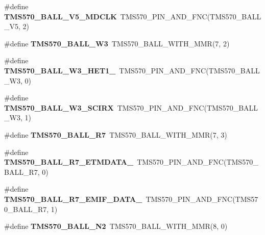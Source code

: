 \begin{DoxyCompactItemize}
\#define {\bfseries T\+M\+S570\+\_\+\+B\+A\+L\+L\+\_\+\+V5\+\_\+\+M\+D\+C\+LK}~T\+M\+S570\+\_\+\+P\+I\+N\+\_\+\+A\+N\+D\+\_\+\+F\+NC(T\+M\+S570\+\_\+\+B\+A\+L\+L\+\_\+\+V5, 2)
\item 
\mbox{\label{tms570ls3137zwt-pins_8h_af2acfd91bc4b3c388499a22ca91abc18}} 
\#define {\bfseries T\+M\+S570\+\_\+\+B\+A\+L\+L\+\_\+\+W3}~T\+M\+S570\+\_\+\+B\+A\+L\+L\+\_\+\+W\+I\+T\+H\+\_\+\+M\+MR(7, 2)
\item 
\mbox{\label{tms570ls3137zwt-pins_8h_a9218b1be6ec7d6c8f5b9c576c5be1f23}} 
\#define {\bfseries T\+M\+S570\+\_\+\+B\+A\+L\+L\+\_\+\+W3\+\_\+\+H\+E\+T1\+\_}~T\+M\+S570\+\_\+\+P\+I\+N\+\_\+\+A\+N\+D\+\_\+\+F\+NC(T\+M\+S570\+\_\+\+B\+A\+L\+L\+\_\+\+W3, 0)
\item 
\mbox{\label{tms570ls3137zwt-pins_8h_a04063c69d1ffd364aa96d262b5d6d18b}} 
\#define {\bfseries T\+M\+S570\+\_\+\+B\+A\+L\+L\+\_\+\+W3\+\_\+\+S\+C\+I\+RX}~T\+M\+S570\+\_\+\+P\+I\+N\+\_\+\+A\+N\+D\+\_\+\+F\+NC(T\+M\+S570\+\_\+\+B\+A\+L\+L\+\_\+\+W3, 1)
\item 
\mbox{\label{tms570ls3137zwt-pins_8h_ac563685f12bde843205703eafec18208}} 
\#define {\bfseries T\+M\+S570\+\_\+\+B\+A\+L\+L\+\_\+\+R7}~T\+M\+S570\+\_\+\+B\+A\+L\+L\+\_\+\+W\+I\+T\+H\+\_\+\+M\+MR(7, 3)
\item 
\mbox{\label{tms570ls3137zwt-pins_8h_ab460d5b562af535b1b3542f63458f189}} 
\#define {\bfseries T\+M\+S570\+\_\+\+B\+A\+L\+L\+\_\+\+R7\+\_\+\+E\+T\+M\+D\+A\+T\+A\+\_}~T\+M\+S570\+\_\+\+P\+I\+N\+\_\+\+A\+N\+D\+\_\+\+F\+NC(T\+M\+S570\+\_\+\+B\+A\+L\+L\+\_\+\+R7, 0)
\item 
\mbox{\label{tms570ls3137zwt-pins_8h_a1208a222d377043f80611c951f17dc9a}} 
\#define {\bfseries T\+M\+S570\+\_\+\+B\+A\+L\+L\+\_\+\+R7\+\_\+\+E\+M\+I\+F\+\_\+\+D\+A\+T\+A\+\_}~T\+M\+S570\+\_\+\+P\+I\+N\+\_\+\+A\+N\+D\+\_\+\+F\+NC(T\+M\+S570\+\_\+\+B\+A\+L\+L\+\_\+\+R7, 1)
\item 
\mbox{\label{tms570ls3137zwt-pins_8h_ab510c0e913796c3ca4e79da021863a21}} 
\#define {\bfseries T\+M\+S570\+\_\+\+B\+A\+L\+L\+\_\+\+N2}~T\+M\+S570\+\_\+\+B\+A\+L\+L\+\_\+\+W\+I\+T\+H\+\_\+\+M\+MR(8, 0)

\end{DoxyCompactItemize}

